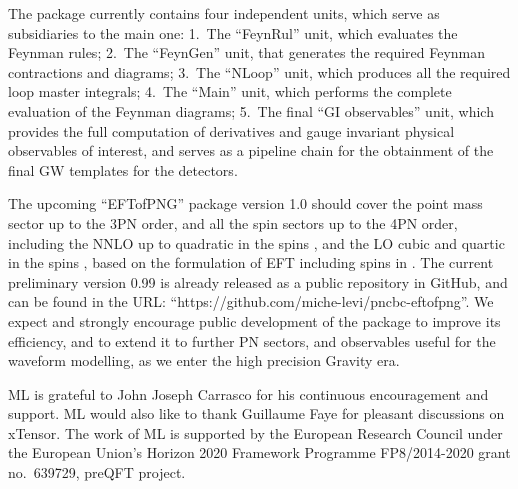 \documentclass[a4paper,11pt]{article}
\begin{document}
The package currently contains four independent units, which serve as subsidiaries 
to the main one: 1.~The ``FeynRul'' unit, which evaluates the Feynman rules; 2.~The 
``FeynGen'' unit, that generates the required Feynman contractions and diagrams; 3.~The 
``NLoop'' unit, which produces all the required loop master integrals; 4.~The ``Main'' unit, 
which performs the complete evaluation of the Feynman diagrams; 5.~The final ``GI 
observables'' unit, which provides the full computation of derivatives and gauge 
invariant physical observables of interest, and serves as a pipeline chain for the 
obtainment of the final GW templates for the detectors. 

The upcoming ``EFTofPNG'' package version 1.0 should cover the point mass sector up 
to the 3PN order, and all the spin sectors up to the 4PN order, including the NNLO up to 
quadratic in the spins 
\cite{Levi:2011eq,Levi:2014sba,Levi:2015uxa,Levi:2015ixa,Levi:2016ofk}, and the LO cubic and 
quartic in the spins \cite{Levi:2014gsa}, based on the formulation of EFT including spins in 
\cite{Levi:2015msa}. The current preliminary version 0.99 is already released as a public 
repository in GitHub, and can be found in the URL: 
``https://github.com/miche-levi/pncbc-eftofpng''. We expect and strongly encourage public 
development of the package to improve its efficiency, and to extend it to further PN 
sectors, and observables useful for the waveform modelling, as we enter 
the high precision Gravity era.


\acknowledgments

ML is grateful to John Joseph Carrasco for his continuous encouragement and support.
ML would also like to thank Guillaume Faye for pleasant discussions on xTensor.
The work of ML is supported by the European Research Council
under the European Union's Horizon 2020 Framework Programme 
FP8/2014-2020 grant no.~639729, preQFT project.



\end{document}
